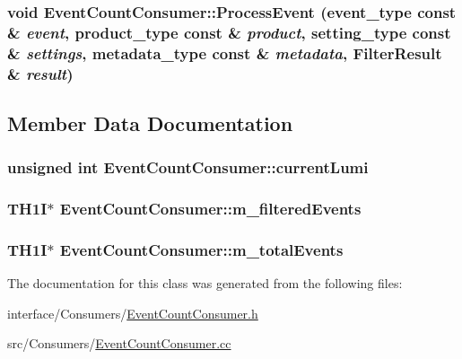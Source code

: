 \label{classEventCountConsumer_a2d04b40136bd826a4a004eb36c3354aa}
\hypertarget{classEventCountConsumer_ad252ca05c06d57a5f333cdb2081349e1}{
\subsubsection[{ProcessEvent}]{\setlength{\rightskip}{0pt plus 5cm}void EventCountConsumer::ProcessEvent (event\_\-type const \& {\em event}, \/  product\_\-type const \& {\em product}, \/  setting\_\-type const \& {\em settings}, \/  metadata\_\-type const \& {\em metadata}, \/  FilterResult \& {\em result})}}
\label{classEventCountConsumer_ad252ca05c06d57a5f333cdb2081349e1}


\subsection{Member Data Documentation}
\hypertarget{classEventCountConsumer_a5bdcae7f74a5b2a8851c13c94a2c280e}{
\subsubsection[{currentLumi}]{\setlength{\rightskip}{0pt plus 5cm}unsigned int {\bf EventCountConsumer::currentLumi}}}
\label{classEventCountConsumer_a5bdcae7f74a5b2a8851c13c94a2c280e}
\hypertarget{classEventCountConsumer_a5b23dafc4a1424978b7ebfbaabf9a160}{
\subsubsection[{m\_\-filteredEvents}]{\setlength{\rightskip}{0pt plus 5cm}TH1I$\ast$ {\bf EventCountConsumer::m\_\-filteredEvents}}}
\label{classEventCountConsumer_a5b23dafc4a1424978b7ebfbaabf9a160}
\hypertarget{classEventCountConsumer_a8fb9d1d62cab36dd76967af15061ece7}{
\subsubsection[{m\_\-totalEvents}]{\setlength{\rightskip}{0pt plus 5cm}TH1I$\ast$ {\bf EventCountConsumer::m\_\-totalEvents}}}
\label{classEventCountConsumer_a8fb9d1d62cab36dd76967af15061ece7}


The documentation for this class was generated from the following files:\begin{DoxyCompactItemize}
\item 
interface/Consumers/\hyperlink{EventCountConsumer_8h}{EventCountConsumer.h}\item 
src/Consumers/\hyperlink{EventCountConsumer_8cc}{EventCountConsumer.cc}\end{DoxyCompactItemize}
